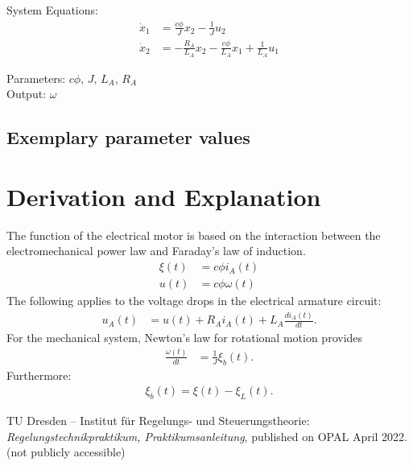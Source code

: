 \documentclass[10pt,a4paper]{article}
\begin{document}
	\noindent System Equations:			
	\begin{subequations}
	\begin{align}
		\dot{x}_1 &= \frac{c\phi}{J}x_2 - \frac{1}{J}u_2 \\
		\dot{x}_2 &= -\frac{R_A}{L_A}x_2 - \frac{c\phi}{L_A}x_1 + \frac{1}{L_A}u_1
	\end{align}
	\end{subequations}

	\noindent
	Parameters: $c\phi, \, J, \, L_A, \, R_A$%
	\\
	Output: $\omega$ \\ %
	

	
	\subsection{Exemplary parameter values}
	

	
	\section{Derivation and Explanation} %
	The function of the electrical motor is based on the interaction between the electromechanical power law and Faraday's law of induction.
	\begin{align}
		\xi (t) &= c\phi i_A(t) \\
		u(t) &= c\phi \omega(t)
	\end{align}
	The following applies to the voltage drops in the electrical armature circuit: 
	\begin{align}
		u_A(t) &= u(t) + R_A i_A(t) + L_A\frac{di_A(t)}{dt}. 
	\end{align}
	For the mechanical system, Newton's law for rotational motion provides
	\begin{align}
		\frac{\omega(t)}{dt} &= \frac{1}{J}\xi_b(t). 
	\end{align}
	Furthermore: 
	\begin{align}
		\xi_b(t) = \xi(t) - \xi_L(t). 
	\end{align}
	
	\begin{thebibliography}{10}		
		TU Dresden – Institut für Regelungs- und Steuerungstheorie: 
		\textit{Regelungstechnikpraktikum, Praktikumsanleitung}, published on OPAL April 2022. \\
		(not publicly accessible)
	\end{thebibliography}
\end{document}
